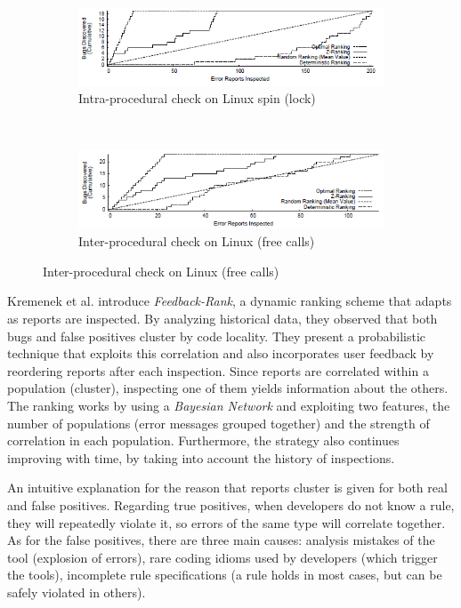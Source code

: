  \begin{figure}[H]
     \begin{subfigure}{1\textwidth}
         \centering
         \includegraphics[scale=0.7]{./src/z_ranking_result_linux_intra.png}
         \caption{Intra-procedural check on Linux spin (lock)}
     \end{subfigure}\\
     \begin{subfigure}{1\textwidth}
         \centering
         \includegraphics[scale=0.7]{./src/z_ranking_result_linux_inter.png}
         \caption{Inter-procedural check on Linux (free calls)}
     \end{subfigure}
 \end{figure}


 Kremenek et al. \cite{correlation_exploitation} introduce \textit{Feedback-Rank}, a dynamic ranking scheme that adapts as reports are inspected. By analyzing historical data, they observed that both bugs and false positives cluster by code locality. They present a probabilistic technique that exploits this correlation and also incorporates user feedback by reordering reports after each inspection. Since reports are correlated within a population (cluster), inspecting one of them yields information about the others. The ranking works by using a \textit{Bayesian Network} and exploiting two features, the number of populations (error messages grouped together) and the strength of correlation in each population. Furthermore, the strategy also continues improving with time, by taking into account the history of inspections.

 An intuitive explanation for the reason that reports cluster is given for both real and false positives. Regarding true positives, when developers do not know a rule, they will repeatedly violate it, so errors of the same type will correlate together. As for the false positives, there are three main causes: analysis mistakes of the tool (explosion of errors), rare coding idioms used by developers (which trigger the tools), incomplete rule specifications (a rule holds in most cases, but can be safely violated in others).

